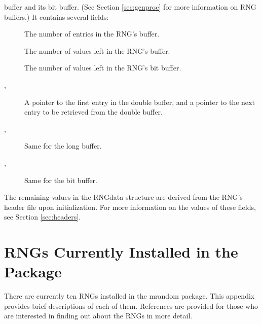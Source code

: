\begin{description}
buffer and its bit buffer.  (See Section \ref{sec:genproc} for more
information on RNG buffers.)  It contains several fields:
\begin{description}
\item[] The number of entries in the RNG's buffer.
\item[] The number of values left in the RNG's buffer.
\item[] The number of values left in the RNG's bit buffer.
\item[, ] A pointer to the first entry in the double
buffer, and a pointer to the next entry to be retrieved from the
double buffer.
\item[, ] Same for the long buffer.
\item[, ] Same for the bit buffer.
\end{description}
\end{description}

The remaining values in the RNGdata structure are derived
from the RNG's header file upon initialization.  For more information on
the values of these fields, see Section \ref{sec:headers}.

\section{RNGs Currently Installed in the Package}
\label{app:installedrngs}
There are currently ten RNGs installed in the mrandom package.  This
appendix provides brief descriptions of each of them.  References are
provided for those who are interested in finding out about the RNGs in
more detail.

